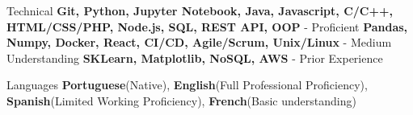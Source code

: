 
\begin{cvskills}
  \cvskill
    {Technical} %
    {\textbf{Git, Python, Jupyter Notebook, Java, Javascript, C/C++, HTML/CSS/PHP, Node.js, SQL, REST API, OOP} - Proficient \break \textbf{Pandas, Numpy, Docker, React, CI/CD, Agile/Scrum, Unix/Linux} - Medium Understanding \break \textbf{SKLearn, Matplotlib, NoSQL, AWS} - Prior Experience} %

  \cvskill
    {Languages} %
    {\textbf{Portuguese}(Native), \textbf{English}(Full Professional Proficiency), \textbf{Spanish}(Limited Working Proficiency), \textbf{French}(Basic understanding) } %

\end{cvskills}
